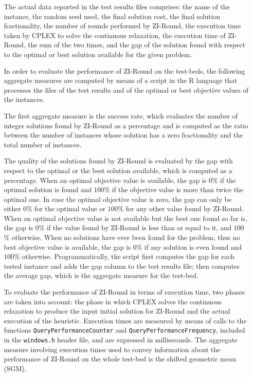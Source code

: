 \documentclass[a4paper,12pt]{book}
\begin{document}
The actual data reported in the test results files comprises: the name of the instance, the random seed used, the final solution cost, the final solution fractionality, the number of rounds performed by ZI-Round, the execution time taken by CPLEX to solve the continuous relaxation, the execution time of ZI-Round, the sum of the two times, and the gap of the solution found with respect to the optimal or best solution available for the given problem. \par 

In order to evaluate the performance of ZI-Round on the test-beds, the following aggregate measures are computed by means of a script in the R language that processes the files of the test results and of the optimal or best objective values of the instances. \par
The first aggregate measure is the success rate, which evaluates the number of integer solutions found by ZI-Round as a percentage and is computed as the ratio between the number of instances whose solution has a zero fractionality and the total number of instances. \par
The quality of the solutions found by ZI-Round is evaluated by the gap with respect to the optimal or the best solution available, which is computed as a percentage. When an optimal objective value is available, the gap is $0$\% if the optimal solution is found and $100$\% if the objective value is more than twice the optimal one. In case the optimal objective value is zero, the gap can only be either $0$\% for the optimal value or $100$\% for any other value found by ZI-Round. When an optimal objective value is not available but the best one found so far is, the gap is $0$\% if the value found by ZI-Round is less than or equal to it, and $100$\% otherwise. When no solutions have ever been found for the problem, thus no best objective value is available, the gap is $0$\% if any solution is even found and $100$\% otherwise. Programmatically, the script first computes the gap for each tested instance and adds the gap column to the test results file; then computes the average gap, which is the aggregate measure for the test-bed. \par
To evaluate the performance of ZI-Round in terms of execution time, two phases are taken into account: the phase in which CPLEX solves the continuous relaxation to produce the input initial solution for ZI-Round and the actual execution of the heuristic. Execution times are measured by means of calls to the functions \texttt{QueryPerformanceCounter} and \texttt{QueryPerformanceFrequency}, included in the \texttt{windows.h} header file, and are expressed in milliseconds. The aggregate measure involving execution times used to convey information about the performance of ZI-Round on the whole test-bed is the shifted geometric mean (SGM). 
\end{document}
